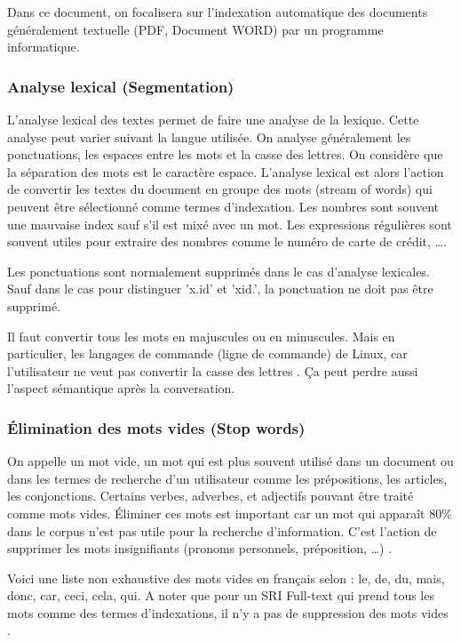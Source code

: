 Dans ce document, on focalisera sur l'indexation automatique des documents généralement textuelle (PDF, Document WORD) par un programme informatique.

\subsubsection{Analyse lexical (Segmentation)}
L'analyse lexical des textes permet de faire une analyse de la lexique. Cette analyse peut varier suivant la langue utilisée. On analyse généralement les ponctuations, les espaces entre les mots et la casse des lettres. On considère que la séparation des mots est le caractère espace. L'analyse lexical est alors l'action de convertir les textes du document en groupe des mots (stream of words) qui peuvent être sélectionné comme termes d'indexation. Les nombres sont souvent une mauvaise index sauf s'il est mixé avec un mot. Les expressions régulières sont souvent utiles pour extraire des nombres comme le numéro de carte de crédit, \dots \citep*{modern-ir, approche-semantique}.

Les ponctuations sont normalement supprimés dans le cas d'analyse lexicales. Sauf dans le cas pour distinguer 'x.id' et 'xid.', la ponctuation ne doit pas être supprimé. \citep{modern-ir}

Il faut convertir tous les mots en majuscules ou en minuscules. Mais en particulier, les langages de commande (ligne de commande) de Linux, car l'utilisateur ne veut pas convertir la casse des lettres \citep{modern-ir}. Ça peut perdre aussi l'aspect sémantique après la conversation.

\subsubsection{Élimination des mots vides (Stop words)}
On appelle un mot vide, un mot qui est plus souvent utilisé dans un document ou dans les termes de recherche d'un utilisateur comme les prépositions, les articles, les conjonctions. Certains verbes, adverbes, et adjectifs pouvant être traité comme mots vides. Éliminer ces mots est important car un mot qui apparaît 80\% dans le corpus n'est pas utile pour la recherche d'information. C'est l'action de supprimer les mots insignifiants (pronoms personnels, préposition, \dots) \citep*{modern-ir, approche-semantique, sarch-engine-vsm}.

Voici une liste non exhaustive des mots vides en français selon \citep{stopwords_french}: le, de, du, mais, donc, car, ceci, cela, qui. A noter que pour un SRI Full-text qui prend tous les mots comme des termes d'indexations, il n'y a pas de suppression des mots vides \citep{modern-ir}.

